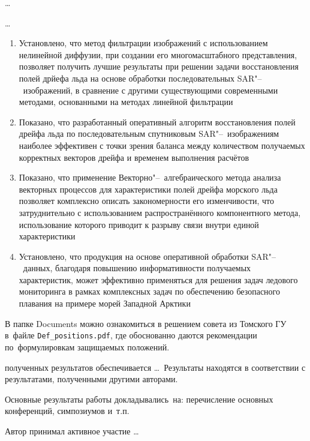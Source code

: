 {\influence} \ldots

{\methods} \ldots

{}
\begin{enumerate}
  \item Установлено, что метод фильтрации изображений с использованием нелинейной диффузии, при создании его многомасштабного представления, позволяет получить лучшие результаты при решении задачи восстановления полей дрйефа льда на основе обработки последовательных SAR"--~изображений, в сравнение с другими существующими современными методами, основанными на методах линейной фильтрации
  \item Показано, что разработанный оперативный алгоритм восстановления полей дрейфа льда по последовательным спутниковым SAR"--~изображениям наиболее эффективен с точки зрения баланса между количеством получаемых корректных векторов дрейфа и временем выполнения расчётов
  \item Показано, что применение Векторно"--~алгебраического метода анализа векторных процессов для характеристики полей дрейфа морского льда позволяет комплексно описать закономерности его изменчивости, что затруднительно с использованием распространённого компонентного метода, использование которого приводит к разрыву связи внутри единой характеристики
  \item Установлено, что продукция на основе оперативной обработки SAR"--~данных, благодаря повышению информативности получаемых характеристик, может эффективно применяться для решения задач ледового мониторинга в рамках комплексных задач по обеспечению безопасного плавания на примере морей Западной Арктики
\end{enumerate}
В папке Documents можно ознакомиться в решением совета из Томского ГУ
в~файле \verb+Def_positions.pdf+, где обоснованно даются рекомендации
по~формулировкам защищаемых положений. 

{\reliability} полученных результатов обеспечивается \ldots \ Результаты находятся в соответствии с результатами, полученными другими авторами.


{\probation}
Основные результаты работы докладывались~на:
перечисление основных конференций, симпозиумов и~т.\:п.

{\contribution} Автор принимал активное участие \ldots



